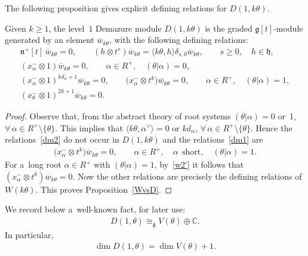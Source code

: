 The following proposition gives explicit def\/ining relations for $D(1,k\theta)$.
\begin{proposition}
\label{WvsD}
Given $k\geq 1$, the level~$1$ Demazure module $D(1,k\theta)$ is the graded $\mathfrak{g}[t]$-module generated by an
element $\overline{w}_{k\theta}$, with the following defining relations:
\begin{gather*}
\mathfrak{n}^{+}[t]\, \overline{w}_{k\theta}=0,
\qquad
(h \otimes t^s) \overline{w}_{k\theta} = \langle k\theta, h\rangle \delta_{s,0} \overline{w}_{k\theta},
\qquad
s\geq0,
\quad
h\in\mathfrak{h},
\\
(x^{-}_{\alpha}\otimes 1) \overline{w}_{k\theta}=0,
\qquad
\alpha\in R^+,
\quad
(\theta|\alpha)=0,
\\
(x^{-}_{\alpha} \otimes 1)^{kd_{\alpha}+1} \overline{w}_{k\theta}=0,
\qquad
\big(x^{-}_{\alpha} \otimes t^k\big) \overline{w}_{k\theta}=0,
\qquad
\alpha\in R^+,
\quad
(\theta|\alpha)=1,
\\
(x^{-}_{\theta} \otimes 1)^{2k+1} \overline{w}_{k\theta}=0.
\end{gather*}
\end{proposition}
\begin{proof}
Observe that, from the abstract theory of root systems $(\theta|\alpha)= 0$ or~1,
$\forall\, \alpha \in R^{+}\setminus \{\theta\}$.
This implies that $\langle k\theta, \alpha^{\vee}\rangle = 0$ or $kd_{\alpha}$, $\forall\, \alpha \in R^{+}\setminus \{\theta\}$.
Hence the relations~\eqref{dm2} do not occur in $D(1,k\theta)$ and the relations~\eqref{dm1} are
\begin{gather*}
\big(x^{-}_{\alpha} \otimes t^k\big) \overline{w}_{k\theta}=0,
\qquad
\alpha\in R^+,
\quad
\alpha~~\text{short},
\quad
(\theta|\alpha)=1.
\end{gather*}
For a~long root $\alpha\in R^+$ with $(\theta|\alpha)=1$, by~\eqref{w2'} it follows that $(x^{-}_{\alpha} \otimes t^k) \overline{w}_{k\theta}=0$.
Now the other relations are precisely the def\/ining relations of $W(k\theta)$. This proves Proposition~\ref{WvsD}.
\end{proof}
We record below a~well-known fact, for later use:
\begin{gather*}
D(1, \theta)\cong_{\mathfrak{g}} V(\theta) \oplus \mathbb{C}.
\end{gather*}
In particular,
\begin{gather}
\label{dimd}
\dim D(1, \theta)= \dim V(\theta)+1.
\end{gather}

